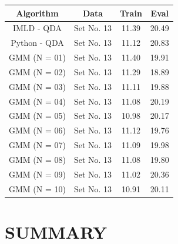 \documentclass{article}
\begin{document}
\centering
\begin{table}[ht]
\centering
\renewcommand{\arraystretch}{1.5}
\begin{tabular}{|c|c|c|c|}
	\hline
	\rowcolor{gray!20}
	Algorithm & Data & Train & Eval\\
	\hline 
	IMLD - QDA   & Set No. 13 & 11.39 & 20.49\\
	\hline
	Python - QDA & Set No. 13 & 11.12 & 20.83\\
	\hline
	GMM (N = 01) & Set No. 13 & 11.40 & 19.91\\
	\hline
	GMM (N = 02) & Set No. 13 & 11.29 & 18.89\\
	\hline
	GMM (N = 03) & Set No. 13 & 11.11 & 19.88\\
	\hline
	GMM (N = 04) & Set No. 13 & 11.08 & 20.19\\
	\hline
	GMM (N = 05) & Set No. 13 & 10.98 & 20.17\\
	\hline
	GMM (N = 06) & Set No. 13 & 11.12 & 19.76\\
	\hline
	GMM (N = 07) & Set No. 13 & 11.09 & 19.98\\
	\hline
	GMM (N = 08) & Set No. 13 & 11.08 & 19.80\\
	\hline
	GMM (N = 09) & Set No. 13 & 11.02 & 20.36\\
	\hline
	GMM (N = 10) & Set No. 13 & 10.91 & 20.11\\
	\hline
	\end{tabular}
\end{table}

\section{\MakeUppercase{Summary}}
\end{document}

